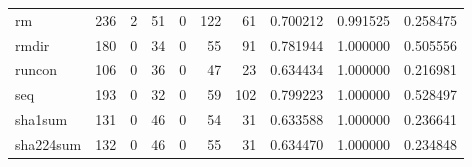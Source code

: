 \begin{tabular}{lrrrrrrrrr}
rm        &                                                236 &                                                  2 &                                                 51 &                                                  0 &                                                122 &                                                 61 &                                           0.700212 &                               0.991525 &                             0.258475 \\
rmdir     &                                                180 &                                                  0 &                                                 34 &                                                  0 &                                                 55 &                                                 91 &                                           0.781944 &                               1.000000 &                             0.505556 \\
runcon    &                                                106 &                                                  0 &                                                 36 &                                                  0 &                                                 47 &                                                 23 &                                           0.634434 &                               1.000000 &                             0.216981 \\
seq       &                                                193 &                                                  0 &                                                 32 &                                                  0 &                                                 59 &                                                102 &                                           0.799223 &                               1.000000 &                             0.528497 \\
sha1sum   &                                                131 &                                                  0 &                                                 46 &                                                  0 &                                                 54 &                                                 31 &                                           0.633588 &                               1.000000 &                             0.236641 \\
sha224sum &                                                132 &                                                  0 &                                                 46 &                                                  0 &                                                 55 &                                                 31 &                                           0.634470 &                               1.000000 &                             0.234848 \\

\end{tabular}
